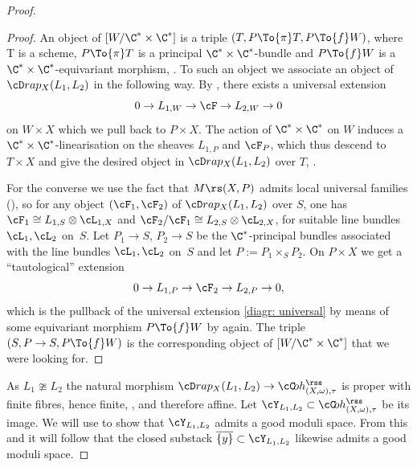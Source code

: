 \begin{proof}
\begin{proof}
An object of $[W/\C^*\times\C^*]$ is a triple $(T, P\To{\pi} T, P\To{f} W)$, where T is a scheme, $ P\To{\pi} T$ is a principal $\C^*\times\C^*$-bundle and $P\To{f} W$ is a $\C^*\times\C^*$-equivariant morphism, \cf \cite[Def.\,3.1]{Alper}. To such an object we associate an object of $\cD rap_X(L_1,L_2)$ in the following way. By \cite[Chap.\,7]{LePotier_Lectures},
\cite[Cor.\,3.4]{Lange} there exists a universal extension
\begin{equation}
\label{diagr: universal}
0\to L_{1,W}\to \cF\to L_{2,W}\to 0
\end{equation}
on $W\times X$ which we pull back to $P\times X$. The action of $\C^*\times\C^*$ on $W$ induces a $\C^*\times\C^*$-linearisation on the sheaves $L_{1,P}$ and $\cF_P$, which thus descend to $T\times X$ and give the desired object in $\cD rap_X(L_1,L_2)$ over $T$, \cite[Th.\,4.2.14]{HL}.

For the converse we use the fact that $M{\rs}(X,P)$ admits local universal families (\cf \cite[App.\,4D.\,VI]{HL}), so for any object $(\cF_1,\cF_2)$ of $\cD rap_X(L_1,L_2)$ over $S$, one has $\cF_1\cong L_{1,S}\otimes\cL_{1,X}$ and $\cF_2/\cF_1\cong L_{2,S}\otimes\cL_{2,X}$, for suitable line bundles $\cL_{1}, \cL_2$ on~$S$.
Let $P_1\to S$, $P_2\to S$ be the $\C^*$-principal bundles associated with the line bundles $\cL_{1}, \cL_2$ on~$S$ and let $P:=P_1\times_SP_2$. On $P\times X$ we get a ``tautological'' extension
\[
0\to L_{1,P}\to \cF_2\to L_{2,P}\to 0,
\]
which is the pullback of the universal extension \eqref{diagr: universal} by means of some equivariant morphism $P\To{f} W$ by \cite[Cor.\,3.4]{Lange} again. The triple $(S,P\to S, P\To{f} W)$ is the corresponding object of $[W/\C^*\times\C^*]$ that we were looking for.
\end{proof}

As $L_1\ncong L_2$ the natural morphism $\cD rap_X(L_1,L_2)\to \cC\!oh_{(X,\omega),\tau}^{{\rss}}$ is proper with finite fibres, hence finite, \cf \cite[\href{https://stacks.math.columbia.edu/tag/0F2N}{Tag\,0F2N}]{stacks-project}, and therefore affine. Let $\cY_{L_1,L_2}\subset \cC\!oh_{(X,\omega),\tau}^{{\rss}}$ be its image. We will use \cite[Prop.\,1.4]{AlperFS} to show that $\cY_{L_1,L_2}$ admits a good moduli space. From this and \cite[Lem.\,4.14]{Alper13} it will follow that the closed substack $\overline{\{y\}}\subset \cY_{L_1,L_2}$ likewise admits a good moduli space.


\end{proof}
